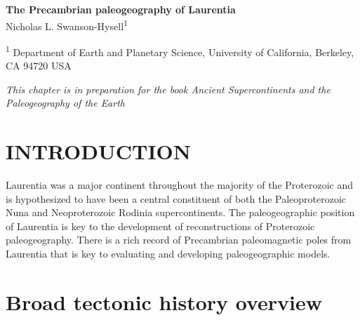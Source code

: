 \documentclass[11pt,letterpaper]{article}
\begin{document}
\begin{flushleft}
{\Large \textbf{The Precambrian paleogeography of Laurentia}}
\\

Nicholas L. Swanson-Hysell\textsuperscript{1}

\bigskip

\textsuperscript{1} Department of Earth and Planetary Science, University of California, Berkeley, CA 94720 USA

\end{flushleft}

\noindent\textit{This chapter is in preparation for the book Ancient Supercontinents and the Paleogeography of the Earth}


\section*{INTRODUCTION}

Laurentia was a major continent throughout the majority of the Proterozoic and is hypothesized to have been a central constituent of both the Paleoproterozoic Nuna and Neoproterozoic Rodinia supercontinents. The paleogeographic position of Laurentia is key to the development of reconstructions of Proterozoic paleogeography. There is a rich record of Precambrian paleomagnetic poles from Laurentia that is key to evaluating and developing paleogeographic models.

\section*{Broad tectonic history overview}
\end{document}
